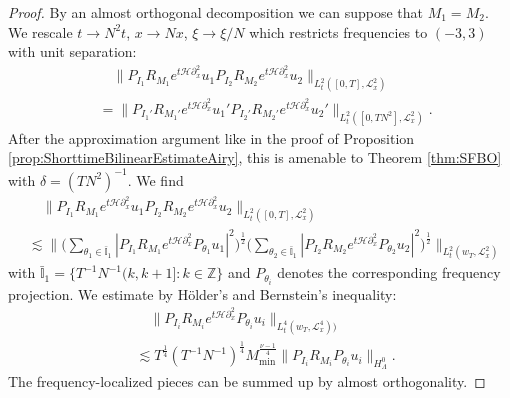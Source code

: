 \documentclass{amsart}
\theoremstyle{definition}
\newcommand{\Z}{\mathbb{Z}}
\begin{document}
\begin{proof}
By an almost orthogonal decomposition we can suppose that $M_1 = M_2$. We rescale $t \to N^2 t$, $x \to Nx$, $\xi \to \xi/N$ which restricts frequencies to $(-3,3)$ with unit separation:
\begin{equation*}
\begin{split}
&\quad \| P_{I_1} R_{M_1} e^{t \mathcal{H} \partial_x^2} u_1 P_{I_2} R_{M_2} e^{t \mathcal{H} \partial_x^2} u_2 \|_{L^2_t([0,T],\mathcal{L}^2_x)} \\
&= \| P_{I_1'} R_{M_1'} e^{t \mathcal{H} \partial_x^2} u_1' P_{I_2'} R_{M_2'} e^{t \mathcal{H} \partial_x^2} u_2' \|_{L^2_t([0,TN^2],\mathcal{L}^2_x)}.
\end{split}
\end{equation*}
After the approximation argument like in the proof of Proposition \ref{prop:ShorttimeBilinearEstimateAiry}, this is amenable to Theorem \ref{thm:SFBO} with $\delta= (TN^2)^{-1}$. We find
\begin{equation*}
\begin{split}
&\quad \| P_{I_1} R_{M_1} e^{t \mathcal{H} \partial_x^2} u_1 P_{I_2} R_{M_2} e^{t \mathcal{H} \partial_x^2} u_2 \|_{L^2_t([0,T],\mathcal{L}^2_x)} \\
&\lesssim \big\| \big( \sum_{\theta_1 \in \bar{\mathbb{I}}_1} |P_{I_1} R_{M_1} e^{t \mathcal{H} \partial_x^2} P_{\theta_1} u_1|^2 \big)^{\frac{1}{2}} \big( \sum_{\theta_2 \in \bar{\mathbb{I}}_1} |P_{I_2} R_{M_2} e^{t \mathcal{H} \partial_x^2} P_{\theta_2} u_2|^2 \big)^{\frac{1}{2}} \big\|_{L^2_t(w_T,\mathcal{L}^2_x)}
\end{split}
\end{equation*}
with $\bar{\mathbb{I}}_1 = \{ T^{-1} N^{-1} (k,k+1] : k \in \Z \}$ and $P_{\theta_i}$ denotes the corresponding frequency projection. We estimate by H\"older's and Bernstein's inequality:
\begin{equation*}
\begin{split}
&\quad \| P_{I_i} R_{M_i} e^{t \mathcal{H} \partial_x^2} P_{\theta_i} u_i \|_{L^4_t(w_T, \mathcal{L}^4_x))} \\
&\lesssim T^{\frac{1}{4}} (T^{-1} N^{-1} )^{\frac{1}{4}} M_{\min}^{\frac{\nu-1}{4}} \| P_{I_i} R_{M_i} P_{\theta_i} u_i \|_{H^0_{\Lambda}}.
\end{split}
\end{equation*}
The frequency-localized pieces can be summed up by almost orthogonality.
\end{proof}
\end{document}
